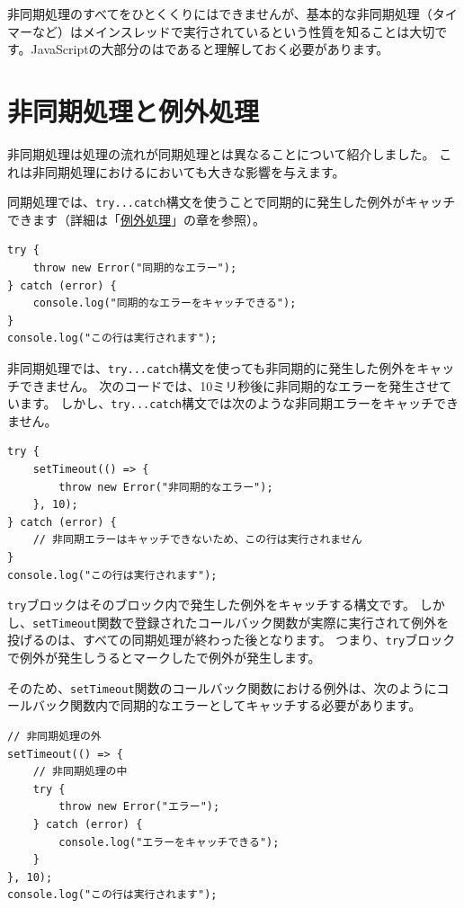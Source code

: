 非同期処理のすべてをひとくくりにはできませんが、基本的な非同期処理（タイマーなど）はメインスレッドで実行されているという性質を知ることは大切です。JavaScriptの大部分の\textbf{}は\textbf{}であると理解しておく必要があります。

\hypertarget{async-processing-and-error-handling}{%
\section{非同期処理と例外処理}\label{async-processing-and-error-handling}}

非同期処理は処理の流れが同期処理とは異なることについて紹介しました。
これは非同期処理における\textbf{}においても大きな影響を与えます。

同期処理では、\texttt{try...catch}構文を使うことで同期的に発生した例外がキャッチできます（詳細は「\hyperlink{error-handling}{例外処理}」の章を参照）。

\begin{lstlisting}
try {
    throw new Error("同期的なエラー");
} catch (error) {
    console.log("同期的なエラーをキャッチできる");
}
console.log("この行は実行されます");
\end{lstlisting}

非同期処理では、\texttt{try...catch}構文を使っても非同期的に発生した例外をキャッチできません。
次のコードでは、10ミリ秒後に非同期的なエラーを発生させています。
しかし、\texttt{try...catch}構文では次のような非同期エラーをキャッチできません。

\begin{lstlisting}
try {
    setTimeout(() => {
        throw new Error("非同期的なエラー");
    }, 10);
} catch (error) {
    // 非同期エラーはキャッチできないため、この行は実行されません
}
console.log("この行は実行されます");
\end{lstlisting}

\texttt{try}ブロックはそのブロック内で発生した例外をキャッチする構文です。
しかし、\texttt{setTimeout}関数で登録されたコールバック関数が実際に実行されて例外を投げるのは、すべての同期処理が終わった後となります。
つまり、\texttt{try}ブロックで例外が発生しうるとマークした\textbf{}で例外が発生します。

そのため、\texttt{setTimeout}関数のコールバック関数における例外は、次のようにコールバック関数内で同期的なエラーとしてキャッチする必要があります。

\begin{lstlisting}
// 非同期処理の外
setTimeout(() => {
    // 非同期処理の中
    try {
        throw new Error("エラー");
    } catch (error) {
        console.log("エラーをキャッチできる");
    }
}, 10);
console.log("この行は実行されます");
\end{lstlisting}

